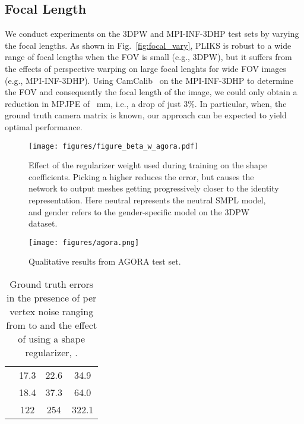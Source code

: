 \documentclass[10pt,twocolumn,letterpaper]{article}
\newcommand{\myrowcolour}{\rowcolor[gray]{0.925}}
\begin{document}
\subsection{Focal Length}
We conduct experiments on the 3DPW and MPI-INF-3DHP test sets by varying the focal lengths. As shown in Fig.~\ref{fig:focal_vary}, PLIKS is robust to a wide range of focal lengths when the FOV is small (e.g., 3DPW), but it suffers from the effects of perspective warping on large focal lenghts for wide FOV images (e.g., MPI-INF-3DHP). Using CamCalib~\cite{spec} on the MPI-INF-3DHP to determine the FOV and consequently the focal length of the image, we could only obtain a reduction in MPJPE of ~mm, i.e., a drop of just 3\%.
In particular, when, the ground truth camera matrix is known, our approach can be expected to yield optimal performance.



\begin{figure}[!b]
\begin{center}
\texttt{[image: figures/figure\_beta\_w\_agora.pdf]}
\end{center}
   \caption{Effect of the regularizer weight used during training on the shape coefficients. Picking a higher  reduces the error, but causes the network to output meshes getting progressively closer to the identity representation. Here neutral represents the neutral SMPL model, and gender refers to the gender-specific model on the 3DPW~\cite{3dpw} dataset. 
}
\label{fig:beta_vary}
\end{figure}


\begin{figure*}[ht]
	\centering
    \texttt{[image: figures/agora.png]}

 	\caption{	\label{fig:agora} Qualitative results from  AGORA test set.}
\end{figure*}

\begin{table}[]
\centering
\begin{tabular}{l|c|c|c}
\hline
       &  &  &  \\ \hline
   & 17.3   & 22.6   & 34.9   \\\myrowcolour
    & 18.4   & 37.3   & 64.0   \\ 
  & 122    & 254    & 322.1  \\ \hline
\end{tabular}\caption{\label{tab:reg}Ground truth errors in the presence of per vertex noise ranging from  to  and the effect of using a shape regularizer, .  }
\end{table}
\end{document}
